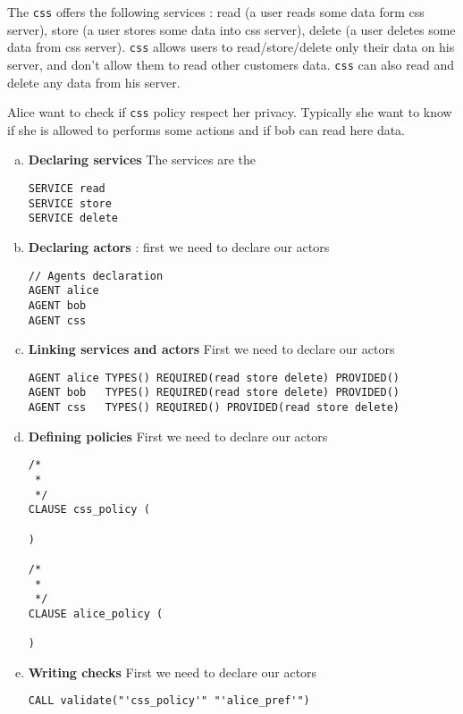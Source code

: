 The \texttt{css} offers the following services : read (a user reads some data form css server),
store (a user stores some data into css server), delete (a user deletes some data from css server).
\texttt{css} allows users to read/store/delete only their data on his server, and don't allow them to read other
customers data. \texttt{css} can also read and delete any data from his server.

Alice want to check if \texttt{css} policy respect her privacy. Typically she want to know if she is allowed to
performs some actions and if bob can read here data.


\begin{enumerate}[a.]

    \item \textbf{Declaring services}
The services are the
\begin{lstlisting}
SERVICE read
SERVICE store
SERVICE delete
\end{lstlisting}

    \item \textbf{Declaring actors} : first we need to declare our actors
\begin{lstlisting}
// Agents declaration
AGENT alice
AGENT bob
AGENT css
\end{lstlisting}

    \item \textbf{Linking services and actors}
First we need to declare our actors
\begin{lstlisting}
AGENT alice TYPES() REQUIRED(read store delete) PROVIDED()
AGENT bob   TYPES() REQUIRED(read store delete) PROVIDED()
AGENT css   TYPES() REQUIRED() PROVIDED(read store delete)
\end{lstlisting}


    \item \textbf{Defining policies}
First we need to declare our actors
\begin{lstlisting}
/*
 *
 */
CLAUSE css_policy (

)

/*
 *
 */
CLAUSE alice_policy (

)
\end{lstlisting}

    \item \textbf{Writing checks}
First we need to declare our actors
\begin{lstlisting}
CALL validate("'css_policy'" "'alice_pref'")
\end{lstlisting}
\end{enumerate}


